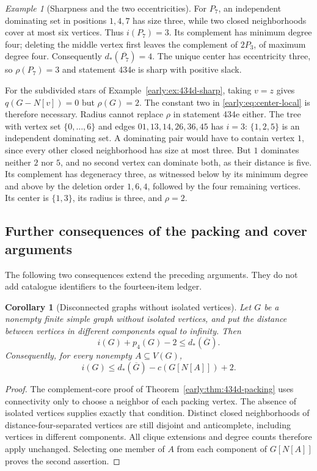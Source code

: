 \documentclass[11pt,a4paper]{article}
\newtheorem{corollary}[theorem]{Corollary}
\theoremstyle{definition}\newtheorem{definition}[theorem]{Definition}
\theoremstyle{remark}\newtheorem{remark}[theorem]{Remark}
\newtheorem{example}[theorem]{Example}
\begin{document}
\begin{example}[Sharpness and the two eccentricities]
For $P_7$, an independent dominating set in positions $1,4,7$ has size
three, while two closed neighborhoods cover at most six vertices.  Thus
$i(P_7)=3$.  Its complement has minimum degree four; deleting the middle
vertex first leaves the complement of $2P_3$, of maximum degree four.
Consequently $d_*(\overline{P_7})=4$.  The unique center has eccentricity
three, so $\rho(P_7)=3$ and statement 434e is sharp with positive slack.

For the subdivided stars of Example~\ref{early:ex:434d-sharp}, taking
$v=z$ gives $q(G-N[v])=0$ but $\rho(G)=2$.  The constant two in
\eqref{early:eq:center-local} is therefore necessary.  Radius cannot
replace $\rho$ in statement 434e either.  The tree with vertex set
$\{0,\ldots,6\}$ and edges
$01,13,14,26,36,45$ has $i=3$: $\{1,2,5\}$ is an independent
dominating set.  A dominating pair would have to contain vertex $1$,
since every other closed neighborhood has size at most three.  But
$1$ dominates neither $2$ nor $5$, and no second vertex can dominate
both, as their distance is five.  Its complement has
degeneracy three, as witnessed below by its minimum degree and above by
the deletion order $1,6,4$, followed by the four remaining vertices.
Its center is $\{1,3\}$, its radius is three, and $\rho=2$.
\end{example}


\subsection{Further consequences of the packing and cover arguments}
The following two consequences extend the preceding arguments. They do
not add catalogue identifiers to the fourteen-item ledger.
\begin{corollary}[Disconnected graphs without isolated vertices]
Let $G$ be a nonempty finite simple graph without isolated vertices, and put the
distance between vertices in different components equal to infinity.
Then
\[
 i(G)+p_4(G)-2\leq d_*(\overline G).
\]
Consequently, for every nonempty $A\subseteq V(G)$,
\[
 i(G)\leq d_*(\overline G)-c(G[N[A]])+2.
\]
\end{corollary}
\begin{proof}
The complement-core proof of Theorem~\ref{early:thm:434d-packing} uses
connectivity only to choose a neighbor of each packing vertex. The absence
of isolated vertices supplies exactly that condition. Distinct closed
neighborhoods of distance-four-separated vertices are still disjoint and
anticomplete, including vertices in different components. All clique
extensions and degree counts therefore apply unchanged. Selecting one
member of $A$ from each component of $G[N[A]]$ proves the second assertion.
\end{proof}
\end{document}

